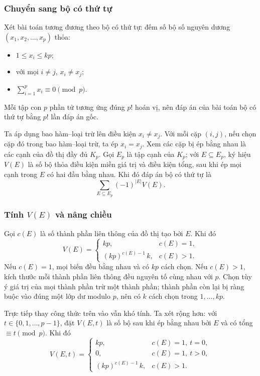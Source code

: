 \documentclass[11pt]{article}
\begin{document}
\subsubsection{Chuyển sang bộ có thứ tự}

Xét bài toán tương đương theo bộ có thứ tự: đếm số bộ số nguyên dương
$(x_1,x_2,\ldots,x_p)$ thỏa:
\begin{itemize}
  \item $1\le x_i\le kp$;
  \item với mọi $i\ne j$, $x_i\ne x_j$;
  \item $\sum_{i=1}^p x_i\equiv 0\pmod p$.
\end{itemize}
Mỗi tập con $p$ phần tử tương ứng đúng $p!$ hoán vị, nên đáp án của bài toán
bộ có thứ tự bằng $p!$ lần đáp án gốc.

Ta áp dụng bao hàm--loại trừ lên điều kiện $x_i\ne x_j$. Với mỗi cặp $(i,j)$,
nếu chọn cặp đó trong bao hàm--loại trừ, ta ép $x_i=x_j$. Xem các cặp bị ép
bằng nhau là các cạnh của đồ thị đầy đủ $K_p$. Gọi $E_p$ là tập cạnh của
$K_p$; với $E\subseteq E_p$, ký hiệu $V(E)$ là số bộ thỏa điều kiện miền giá
trị và điều kiện tổng, sau khi ép mọi cạnh trong $E$ có hai đầu bằng nhau. Khi
đó đáp án bộ có thứ tự là
\[
  \sum_{E\subseteq E_p}(-1)^{|E|}V(E).
\]

\subsubsection{\texorpdfstring{Tính \(V(E)\) và nâng chiều}{Tính V(E) và nâng chiều}}

Gọi $c(E)$ là số thành phần liên thông của đồ thị tạo bởi $E$. Khi đó
\[
  V(E)=
  \begin{cases}
    kp, & c(E)=1,\\
    (kp)^{c(E)-1}\,k, & c(E)>1.
  \end{cases}
\]
Nếu $c(E)=1$, mọi biến đều bằng nhau và có $kp$ cách chọn. Nếu $c(E)>1$, kích
thước mỗi thành phần liên thông đều nguyên tố cùng nhau với $p$. Chọn tùy ý
giá trị của mọi thành phần trừ một thành phần; thành phần còn lại bị ràng buộc
vào đúng một lớp dư modulo $p$, nên có $k$ cách chọn trong $1,\ldots,kp$.

Trực tiếp thay công thức trên vào vẫn khó tính. Ta xét rộng hơn: với
$t\in\{0,1,\ldots,p-1\}$, đặt $V(E,t)$ là số bộ sau khi ép bằng nhau bởi $E$ và
có tổng $\equiv t\pmod p$. Khi đó
\[
  V(E,t)=
  \begin{cases}
    kp, & c(E)=1,\ t=0,\\
    0, & c(E)=1,\ t>0,\\
    (kp)^{c(E)-1}\,k, & c(E)>1.
  \end{cases}
\]
\end{document}
